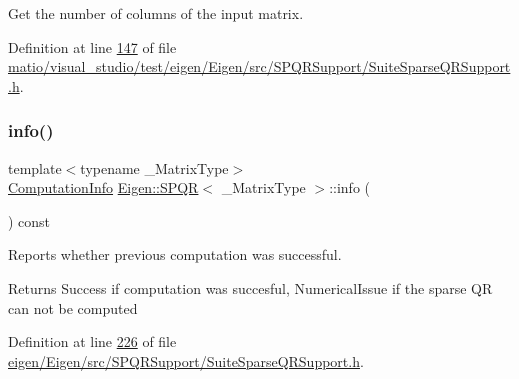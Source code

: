 Get the number of columns of the input matrix. 

Definition at line \hyperlink{matio_2visual__studio_2test_2eigen_2_eigen_2src_2_s_p_q_r_support_2_suite_sparse_q_r_support_8h_source_l00147}{147} of file \hyperlink{matio_2visual__studio_2test_2eigen_2_eigen_2src_2_s_p_q_r_support_2_suite_sparse_q_r_support_8h_source}{matio/visual\+\_\+studio/test/eigen/\+Eigen/src/\+S\+P\+Q\+R\+Support/\+Suite\+Sparse\+Q\+R\+Support.\+h}.

\mbox{\label{class_eigen_1_1_s_p_q_r_a3ab7bacba8d2be20adc10b4d5b6c071f}} 
\subsubsection{\texorpdfstring{info()}{info()}\hspace{0.1cm}{\footnotesize\ttfamily [1/2]}}
{\footnotesize\ttfamily template$<$typename \+\_\+\+Matrix\+Type$>$ \\
\hyperlink{group__enums_ga85fad7b87587764e5cf6b513a9e0ee5e}{Computation\+Info} \hyperlink{class_eigen_1_1_s_p_q_r}{Eigen\+::\+S\+P\+QR}$<$ \+\_\+\+Matrix\+Type $>$\+::info (\begin{DoxyParamCaption}{ }\end{DoxyParamCaption}) const\hspace{0.3cm}{\ttfamily [inline]}}



Reports whether previous computation was successful. 

\begin{DoxyReturn}{Returns}
{\ttfamily Success} if computation was succesful, {\ttfamily Numerical\+Issue} if the sparse QR can not be computed 
\end{DoxyReturn}


Definition at line \hyperlink{eigen_2_eigen_2src_2_s_p_q_r_support_2_suite_sparse_q_r_support_8h_source_l00226}{226} of file \hyperlink{eigen_2_eigen_2src_2_s_p_q_r_support_2_suite_sparse_q_r_support_8h_source}{eigen/\+Eigen/src/\+S\+P\+Q\+R\+Support/\+Suite\+Sparse\+Q\+R\+Support.\+h}.

\mbox{\label{class_eigen_1_1_s_p_q_r_a3ab7bacba8d2be20adc10b4d5b6c071f}} 
